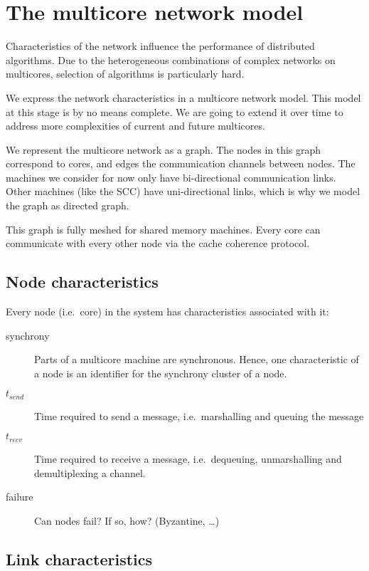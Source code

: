 \documentclass{article}
\begin{document}
\section{The multicore network model}

Characteristics of the network influence the performance of
distributed algorithms. Due to the heterogeneous combinations of
complex networks on multicores, selection of algorithms is
particularly hard.

We express the network characteristics in a multicore network
model. This model at this stage is by no means complete. We are going to
extend it over time to address more complexities of current and future
multicores.

We represent the multicore network as a graph. The nodes in this graph
correspond to cores, and edges the communication channels between
nodes. The machines we consider for now only have bi-directional
communication links. Other machines (like the SCC) have
uni-directional links, which is why we model the graph as directed
graph.

This graph is fully meshed for shared memory machines. Every core can
communicate with every other node via the cache coherence protocol.

\subsection{Node characteristics} 

Every node (i.e.\ core) in the system has characteristics associated
with it:

\begin{description}
\item[synchrony] Parts of a multicore machine are synchronous. Hence,
  one characteristic of a node is an identifier for the synchrony
  cluster of a node.
\item[$t_{send}$] Time required to send a message, i.e.\ marshalling
  and queuing the message
\item[$t_{recv}$] Time required to receive a message, i.e.\
  dequeuing, unmarshalling and demultiplexing a channel.
\item[failure] Can nodes fail? If so, how? (Byzantine, \ldots)
\end{description}

\subsection{Link characteristics} 
\end{document}
